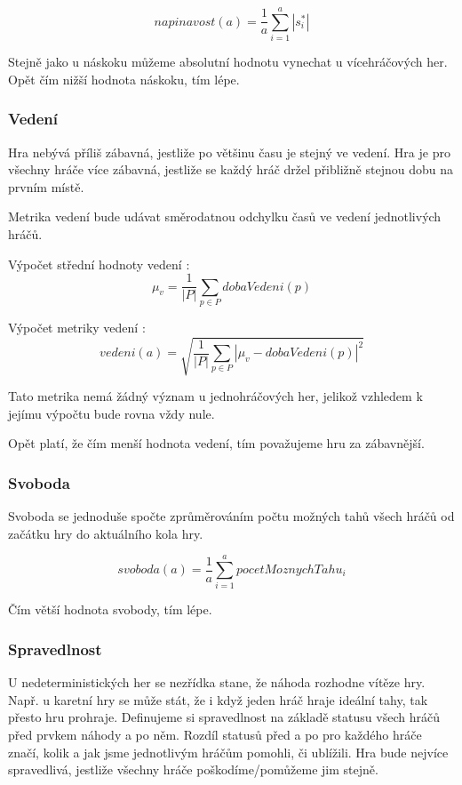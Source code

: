 	\[
	napinavost(a) = \frac{1}{a}\sum_{i=1}^a{|s^*_i|}
\]

Stejně jako u náskoku můžeme absolutní hodnotu vynechat u vícehráčových her. Opět čím nižší hodnota náskoku, tím lépe.

\subsubsection{Vedení}

Hra nebývá příliš zábavná, jestliže po většinu času je stejný ve vedení. Hra je pro všechny hráče více zábavná, jestliže se každý hráč držel přibližně stejnou dobu na prvním místě.

Metrika vedení bude udávat směrodatnou odchylku časů ve vedení jednotlivých hráčů.

Výpočet střední hodnoty vedení :
	\[
	\mu_v = \frac{1}{|P|}\sum_{p \in P} dobaVedeni(p)
\]

Výpočet metriky vedení :
	\[
	vedeni(a) = \sqrt{\frac{1}{|P|}\sum_{p \in P} |\mu_v - dobaVedeni(p)|^2}
\]

Tato metrika nemá žádný význam u jednohráčových her, jelikož vzhledem k jejímu výpočtu bude rovna vždy nule.

Opět platí, že čím menší hodnota vedení, tím považujeme hru za zábavnější.

\subsubsection{Svoboda}

Svoboda se jednoduše spočte zprůměrováním počtu možných tahů všech hráčů od začátku hry do aktuálního kola hry.

\[
	svoboda(a) = \frac{1}{a}\sum_{i=1}^a{pocetMoznychTahu_i}
\]

Čím větší hodnota svobody, tím lépe.

\subsubsection{Spravedlnost}

U nedeterministických her se nezřídka stane, že náhoda rozhodne vítěze hry. Např. u karetní hry se může stát, že i když jeden hráč hraje ideální tahy, tak přesto hru prohraje. Definujeme si spravedlnost na základě statusu všech hráčů před prvkem náhody a po něm. Rozdíl statusů před a po pro každého hráče značí, kolik a jak jsme jednotlivým hráčům pomohli, či ublížili. Hra bude nejvíce spravedlivá, jestliže všechny hráče poškodíme/pomůžeme jim stejně.

